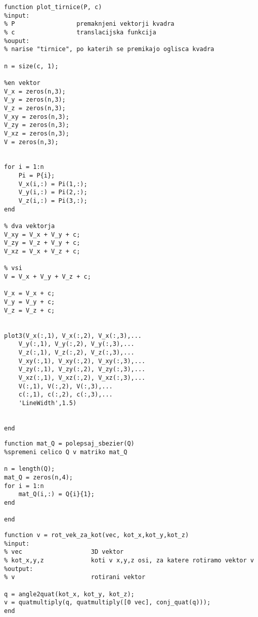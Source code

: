 \documentclass[12pt,a4paper,twoside]{article}
\theoremstyle{definition} %
\theoremstyle{plain} %
\numberwithin{equation}{section}  %
\begin{document}
\begin{lstlisting}[caption = {}]
function plot_tirnice(P, c)
%input:
% P                 premaknjeni vektorji kvadra
% c                 translacijska funkcija
%ouput:
% narise "tirnice", po katerih se premikajo oglisca kvadra

n = size(c, 1);

%en vektor
V_x = zeros(n,3);
V_y = zeros(n,3);
V_z = zeros(n,3);
V_xy = zeros(n,3);
V_zy = zeros(n,3);
V_xz = zeros(n,3);
V = zeros(n,3);


for i = 1:n
    Pi = P{i};
    V_x(i,:) = Pi(1,:);
    V_y(i,:) = Pi(2,:);
    V_z(i,:) = Pi(3,:); 
end

% dva vektorja
V_xy = V_x + V_y + c;
V_zy = V_z + V_y + c;
V_xz = V_x + V_z + c;

% vsi
V = V_x + V_y + V_z + c;

V_x = V_x + c;
V_y = V_y + c;
V_z = V_z + c;


plot3(V_x(:,1), V_x(:,2), V_x(:,3),...
    V_y(:,1), V_y(:,2), V_y(:,3),...
    V_z(:,1), V_z(:,2), V_z(:,3),...
    V_xy(:,1), V_xy(:,2), V_xy(:,3),...
    V_zy(:,1), V_zy(:,2), V_zy(:,3),...
    V_xz(:,1), V_xz(:,2), V_xz(:,3),...
    V(:,1), V(:,2), V(:,3),...
    c(:,1), c(:,2), c(:,3),...
    'LineWidth',1.5)


end
\end{lstlisting}

\begin{lstlisting}[caption = {polepsaj\_sbezier}]
function mat_Q = polepsaj_sbezier(Q)
%spremeni celico Q v matriko mat_Q

n = length(Q);
mat_Q = zeros(n,4);
for i = 1:n
    mat_Q(i,:) = Q{i}{1};
end

end
\end{lstlisting}

\begin{lstlisting}[caption = {rot\_vek\_za\_kot}]
function v = rot_vek_za_kot(vec, kot_x,kot_y,kot_z)
%input:
% vec                   3D vektor
% kot_x,y,z             koti v x,y,z osi, za katere rotiramo vektor v
%output:
% v                     rotirani vektor

q = angle2quat(kot_x, kot_y, kot_z);
v = quatmultiply(q, quatmultiply([0 vec], conj_quat(q)));
end
\end{lstlisting}

\begin{lstlisting}[caption = {}]

\end{lstlisting}
\end{document}
